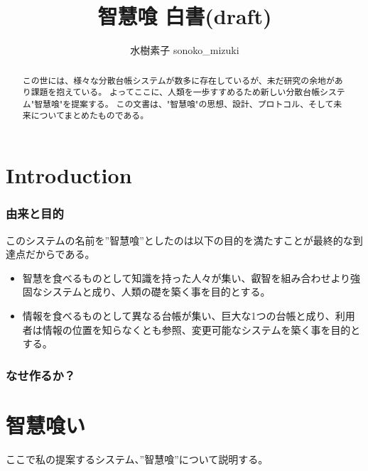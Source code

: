 \documentclass[10pt,a4paper]{jarticle}
\title{智慧喰 白書(draft)}
\author{水樹素子 sonoko\_mizuki}
\begin{document}
\maketitle
\begin{abstract}
この世には、様々な分散台帳システムが数多に存在しているが、未だ研究の余地があり課題を抱えている。
よってここに、人類を一歩すすめるため新しい分散台帳システム"智慧喰"を提案する。
この文書は、"智慧喰"の思想、設計、プロトコル、そして未来についてまとめたものである。
\end{abstract}

\begin{multicols}{2}

\section{Introduction}
\subsubsection{由来と目的}
このシステムの名前を”智慧喰”としたのは以下の目的を満たすことが最終的な到達点だからである。
\begin{itemize}
  \item 智慧を食べるものとして知識を持った人々が集い、叡智を組み合わせより強固なシステムと成り、人類の礎を築く事を目的とする。
  \item 情報を食べるものとして異なる台帳が集い、巨大な1つの台帳と成り、利用者は情報の位置を知らなくとも参照、変更可能なシステムを築く事を目的とする。
\end{itemize}

\subsubsection{なせ作るか？}

\section{智慧喰い}
ここで私の提案するシステム、”智慧喰”について説明する。

\end{multicols}
\end{document}
